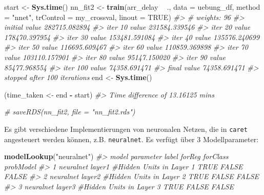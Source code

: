 \documentclass[]{article}
\newenvironment{Shaded}{\begin{snugshade}}{\end{snugshade}}
\newcommand{\CommentTok}[1]{\textcolor[rgb]{0.56,0.35,0.01}{\textit{#1}}}
\newcommand{\DataTypeTok}[1]{\textcolor[rgb]{0.13,0.29,0.53}{#1}}
\newcommand{\KeywordTok}[1]{\textcolor[rgb]{0.13,0.29,0.53}{\textbf{#1}}}
\newcommand{\NormalTok}[1]{#1}
\newcommand{\OperatorTok}[1]{\textcolor[rgb]{0.81,0.36,0.00}{\textbf{#1}}}
\newcommand{\OtherTok}[1]{\textcolor[rgb]{0.56,0.35,0.01}{#1}}
\newcommand{\StringTok}[1]{\textcolor[rgb]{0.31,0.60,0.02}{#1}}
\begin{document}
\begin{Shaded}
\begin{Highlighting}[]
\NormalTok{start <-}\StringTok{ }\KeywordTok{Sys.time}\NormalTok{()}
\NormalTok{nn_fit2 <-}\StringTok{ }\KeywordTok{train}\NormalTok{(arr_delay }\OperatorTok{~}\StringTok{ }\NormalTok{.,}
                 \DataTypeTok{data =}\NormalTok{ uebung_df,}
                 \DataTypeTok{method =} \StringTok{"nnet"}\NormalTok{,}
                 \DataTypeTok{trControl =}\NormalTok{ my_crossval,}
                 \DataTypeTok{linout =} \OtherTok{TRUE}\NormalTok{)}
\CommentTok{#> # weights:  96}
\CommentTok{#> initial  value 282715.082894 }
\CommentTok{#> iter  10 value 231584.339546}
\CommentTok{#> iter  20 value 178470.397954}
\CommentTok{#> iter  30 value 153481.591084}
\CommentTok{#> iter  40 value 135576.240699}
\CommentTok{#> iter  50 value 116695.609467}
\CommentTok{#> iter  60 value 110859.369898}
\CommentTok{#> iter  70 value 103110.157901}
\CommentTok{#> iter  80 value 95147.150020}
\CommentTok{#> iter  90 value 85477.968554}
\CommentTok{#> iter 100 value 74358.691471}
\CommentTok{#> final  value 74358.691471 }
\CommentTok{#> stopped after 100 iterations}
\NormalTok{end <-}\StringTok{ }\KeywordTok{Sys.time}\NormalTok{()}


\NormalTok{(time_taken <-}\StringTok{ }\NormalTok{end }\OperatorTok{-}\StringTok{ }\NormalTok{start)}
\CommentTok{#> Time difference of 13.16125 mins}

\CommentTok{# saveRDS(nn_fit2, file = "nn_fit2.rds")}
\end{Highlighting}
\end{Shaded}

Es gibt verschiedene Implementierungen von neuronalen Netzen, die in
\texttt{caret} angesteuert werden können, z.B. \texttt{neuralnet}. Es
verfügt über 3 Modellparameter:

\begin{Shaded}
\begin{Highlighting}[]
\KeywordTok{modelLookup}\NormalTok{(}\StringTok{"neuralnet"}\NormalTok{)}
\CommentTok{#>       model parameter                    label forReg forClass probModel}
\CommentTok{#> 1 neuralnet    layer1 #Hidden Units in Layer 1   TRUE    FALSE     FALSE}
\CommentTok{#> 2 neuralnet    layer2 #Hidden Units in Layer 2   TRUE    FALSE     FALSE}
\CommentTok{#> 3 neuralnet    layer3 #Hidden Units in Layer 3   TRUE    FALSE     FALSE}
\end{Highlighting}
\end{Shaded}
\end{document}
